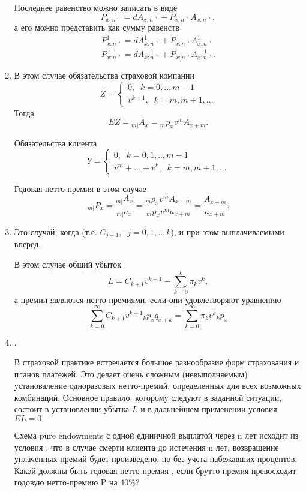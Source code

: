 \begin{enumerate}
	Последнее равенство можно записать в виде 
	\[P_{x:n\urcorner} = dA_{x:n\urcorner} + P_{x:n\urcorner}A_{x:n\urcorner}, \]
	а его можно представить как сумму равенств 
	\begin{gather*}
		P_{x:n\urcorner}^{1} = d A_{x:n\urcorner}^{1}+ P_{x:n\urcorner} A_{x:n\urcorner}^{1}\\
		P_{x:n\urcorner}^{\;\;\;\;1} = d A_{x:n\urcorner}^{\;\;\;\;1} + P_{x:n\urcorner} A_{x:n\urcorner}^{\;\;\;\;1}.	
	\end{gather*}

	\item {}

	В этом случае обязательства страховой компании
	\[
		Z=\begin{cases}
			0, \;\; k=0,..,m-1\\
			v^{k+1}, \;\; k = m, m+1, ...
		\end{cases}
	\]
	Тогда 
	\[EZ = {}_{m|}A_x = {}_mp_xv^mA_{x+m}.\]

	Обязательства клиента 
	\[
		Y=\begin{cases}
			0, \;\; k=0,1, .., m-1\\
			v^m+...+v^k, \;\; k=m,m+1,...
		\end{cases}
	\]

	Годовая нетто-премия в этом случае
	\[ {}_{m|}P_x = \frac{{}_{m|}A_x}{{}_{m|}\ddot{a}_x} = \frac{{}_mp_xv^mA_{x+m}}{{}_mp_xv^m\ddot{a}_{x+m}} = \frac{A_{x+m}}{\ddot{a}_{x+m}}. \]

	\item Это случай, когда  (т.е. $ C_{j+1},\;\; j=0,1,..,k$), и при этом  выплачиваемыми вперед. 

	В этом случае общий убыток 
	\[ L = C_{k+1}v^{k+1} - \sum\limits_{k=0}^{k}\pi_kv^k, \]
	а премии являются нетто-премиями, если они удовлетворяют уравнению 
	\[ \sum\limits_{k=0}^{\infty}C_{k+1}v^{k+1}{}_kp_xq_{x+k} = \sum\limits_{k=0}^{\infty}\pi_kv^k{}_kp_x \]

	\item {}.

	В страховой практике встречается большое разнообразие форм страхования и планов платежей. Это делает очень сложным (невыполняемым) установаление одноразовых нетто-премий, определенных для всех возможных комбинаций. Основное правило, которому следуют в заданной ситуации, состоит в установлении убытка $ L$ и в дальнейшем применении условия $ EL=0.$ 
	\begin{example}
		Схема pure endowments с одной единичной выплатой через n лет исходит из условия , что в случае смерти клиента до истечения n лет, возвращение уплаченных премий будет произведено, но без учета набежавших процентов. Какой должны быть годовая нетто-премия , если брутто-премия превосходит годовую нетто-премию P на 40\%?


\end{example}
\end{enumerate}
